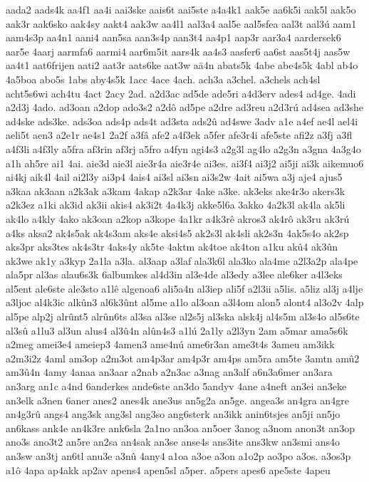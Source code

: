 {aada2
aads4k
aa4f1
aa4i
aai3ske
aais6t
aai5ste
a4a4k1
aak5e
aa6k5i
aak5l
aak5o
aak3r
aak6sko
aak4sy
aakt4
aak3w
aa4l1
aal3a4
aal5e
aal5sfea
aal3t
aal3ú
aam1
aam4s3p
aa4n1
aani4
aan5sa
aan3s4p
aan3t4
aa4p1
aap3r
aar3a4
aardersek6
aar5e
4aarj
aarmfa6
aarmi4
aar6m5it
aars4k
aa4s3
aasfer6
aa6st
aas5t4j
aas5w
aa4t1
aat6frijen
aati2
aat3r
aats6ke
aat3w
aä4n
abats5k
4abe
abe4s5k
4abl
ab4o
4a5boa
abo5s
1abs
aby4s5k
1acc
4ace
4ach.
ach3a
a3chel.
a3chels
ach4sl
acht5s6wi
ach4tu
4act
2acy
2ad.
a2d3ac
ad5de
ade5ri
a4d3erv
ades4
ad4ge.
4adi
a2d3j
4ado.
ad3oan
a2dop
ado3s2
a2dô
ad5pe
a2dre
ad3reu
a2d3rú
ad4sea
ad3she
ad4ske
ads3ke.
ads3oa
ads4p
ads4t
ad3sta
ads2û
ad4swe
3adv
a1e
a4ef
ae4l
ael4i
aeli5t
aen3
a2e1r
ae4s1
2a2f
a3fâ
afe2
a4f3ek
a5fer
afe3r4i
afe5ste
afi2z
a3fj
a3fl
a4f3li
a4f3ly
a5fra
af3rin
af3rj
a5fro
a4fyn
agi4s3
a2g3l
ag4lo
a2g3n
a3gna
4a3g4o
a1h
ah5re
ai1
4ai.
aie3d
aie3l
aie3r4a
aie3r4e
ai3es.
ai3f4
ai3j2
ai5ji
ai3k
aikemuo6
ai4kj
aik4l
4ail
ai2l3y
ai3p4
4ais4
ai3sl
ai3sn
ai3s2w
4ait
ai5wa
a3j
aje4
ajus5
a3kaa
ak3aan
a2k3ak
a3kam
4akap
a2k3ar
4ake
a3ke.
ak3eks
ake4r3o
akers3k
a2k3ez
a1ki
ak3id
ak3ii
akis4
ak3i2t
4a4k3j
akke5l6a
3akko
4a2k3l
ak4la
ak5li
ak4lo
a4kly
4ako
ak3oan
a2kop
a3kope
4a1kr
a4k3rê
akros3
ak4rô
ak3ru
ak3rú
a4ks
aksa2
ak4s5ak
ak4s3am
aks4e
aksi4s5
ak2s3l
ak4sli
ak2s3n
4ak5s4o
ak2sp
aks3pr
aks3tes
ak4s3tr
4aks4y
ak5te
4aktm
ak4toe
ak4ton
a1ku
akû4
ak3ûn
ak3we
ak1y
a3kyp
2a1la
a3la.
al3aap
a3laf
ala3k6l
ala3ko
ala4me
a2l3a2p
ala4pe
ala5pr
al3as
alau6s3k
6albumkes
al4d3in
al3e4de
al3edy
a3lee
ale6ker
a4l3eks
al5ent
ale6ste
ale3sto
a1lê
algenoa6
ali5a4n
al3iep
ali5f
a2l3ii
a5lis.
a5liz
al3j
a4lje
a3ljoc
al4k3ic
alkûn3
al6k3ûnt
al5me
a1lo
al3oan
a3l4om
alon5
alont4
al3o2v
4alp
al5pe
alp2j
alrûnt5
alrûn6ts
al3sa
al3se
al2s5j
al3ska
alsk4j
al4s5m
al3s4o
al5s6te
al3sû
a1lu3
al3un
alus4
al3û4n
alûn4s3
a1lú
2a1ly
a2l3yn
2am
a5mar
ama5s6k
a2meg
amei3e4
ameiep3
4amen3
ame4nú
ame6r3an
ame3t4s
3ameu
am3ikk
a2m3i2z
4aml
am3op
a2m3ot
am4p3ar
am4p3r
am4ps
am5ra
am5te
3amtn
amû2
am3û4n
4amy
4anaa
an3aar
a2nab
a2n3ac
a3nag
an3alf
a6n3a6mer
an3ara
an3arg
an1c
a4nd
6anderkes
ande6ste
an3do
5andyv
4ane
a4neft
an3ei
an3eke
an3elk
a3nen
6aner
anes2
anes4k
ane3us
an5g2a
an5ge.
angea3s
an4gra
an4gre
an4g3rû
angs4
ang3sk
ang3sl
ang3so
ang6sterk
an3ikk
anin6tsjes
an5ji
an5jo
an6kass
ank4e
an4k3re
ank6sla
2a1no
an3oa
an5oer
3anog
a3nom
anon3t
an3op
ano3s
ano3t2
an5re
an2sa
an4sak
an3se
anse4s
ans3ite
ans3kw
an3smi
ans4o
an3sw
an3tj
an6tl
anu3e
a3nû
4any4
a1oa
a3oe
a3on
a1o2p
ao3po
a3os.
a3os3p
a1ô
4apa
ap4akk
ap2av
apens4
apen5sl
a5per.
a5pers
apes6
ape5ste
4apeu
}
